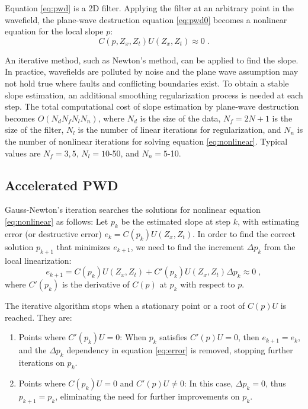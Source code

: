 Equation \ref{eq:pwd} is a 2D filter.
Applying the filter at an arbitrary point in the wavefield,
the plane-wave destruction equation \ref{eq:pwd0} becomes 
a nonlinear equation for the local slope $p$:
\begin{equation}\label{eq:nonlinear}
C(p, Z_x, Z_t)U(Z_x,Z_t) \approx 0\;.
\end{equation}

An iterative method, such as Newton's method,
can be applied to find the slope.
In practice, wavefields are polluted by noise
and the plane wave assumption may not hold true 
where faults and conflicting boundaries exist.
To obtain a stable slope estimation,
an additional smoothing regularization process \cite[]{fomel:R29} 
is needed at each step.
The total computational cost of slope estimation by 
plane-wave destruction becomes $O(N_dN_fN_lN_n)$,
where $N_d$ is the size of the data, 
$N_f=2N+1$ is the size of the filter,
$N_l$ is the number of linear iterations for regularization,
and $N_n$ is the number of nonlinear iterations 
for solving equation \ref{eq:nonlinear}.
Typical values are $N_f=3,5$, $N_l=10$-50, and $N_n=5$-10.



\subsection{Accelerated PWD}

Gauss-Newton's iteration searches the solutions for nonlinear equation 
\ref{eq:nonlinear} as follows:
Let $p_k$ be the estimated slope at step $k$,
with estimating error (or destructive error) $e_k=C(p_k)U(Z_x,Z_t)$.
In order to find the correct solution $p_{k+1}$ that minimizes $e_{k+1} $,
we need to find the increment $\Delta p_k$ from the local linearization:
\begin{equation}\label{eq:error}
e_{k+1} = C(p_k)U(Z_x,Z_t)+C'(p_k)U(Z_x,Z_t)\Delta p_k \approx 0\;,
\end{equation} 
where $C'(p_k)$ is the derivative of $C(p)$ at $p_k$ 
with respect to $p$.

The iterative algorithm stops when a stationary point
or a root of $C(p)U$ is reached. They are:
\begin{enumerate}
\item 
Points where $C'(p_k)U=0$:
When $p_k$ satisfies $C'(p)U=0$, then $e_{k+1}=e_k$,
and the $\Delta p_k$ dependency in equation \ref{eq:error} is removed,
stopping further iterations on $p_k$.
\item 
Points where $C(p_k)U=0$ and $C'(p)U\neq 0$:
In this case, $\Delta p_k=0$, thus $p_{k+1}=p_k$,
eliminating the need for further improvements on $p_k$.
\end{enumerate}



